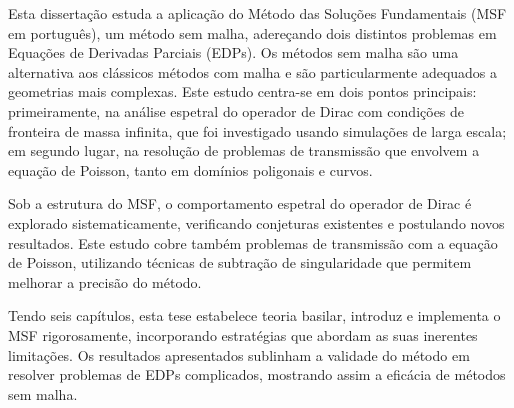 \acresetall
\noindent
Esta dissertação estuda a aplicação do Método das Soluções Fundamentais (MSF em português), um método sem malha, adereçando dois distintos problemas em Equações de Derivadas Parciais (EDPs). Os métodos sem malha são uma alternativa aos clássicos métodos com malha e são particularmente adequados a geometrias mais complexas. Este estudo centra-se em dois pontos principais: primeiramente, na análise espetral do operador de Dirac com condições de fronteira de massa infinita, que foi investigado usando simulações de larga escala; em segundo lugar, na resolução de problemas de transmissão que envolvem a equação de Poisson, tanto em domínios poligonais e curvos.

Sob a estrutura do MSF, o comportamento espetral do operador de Dirac é explorado sistematicamente, verificando conjeturas existentes e postulando novos resultados. Este estudo cobre também problemas de transmissão com a equação de Poisson, utilizando técnicas de subtração de singularidade que permitem melhorar a precisão do método.

Tendo seis capítulos, esta tese estabelece teoria basilar, introduz e implementa o MSF rigorosamente, incorporando estratégias que abordam as suas inerentes limitações. Os resultados apresentados sublinham a validade do método em resolver problemas de EDPs complicados, mostrando assim a eficácia de métodos sem malha.